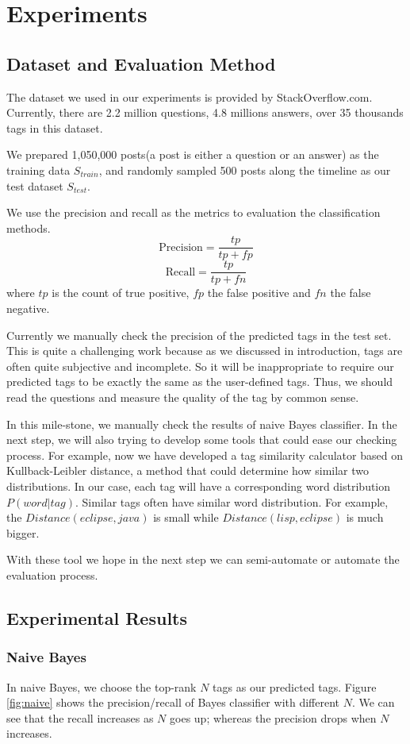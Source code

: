 \section{Experiments}

\subsection{Dataset and Evaluation Method}
The dataset we used in our experiments is provided by StackOverflow.com. Currently, there are 2.2 million questions, 4.8 millions answers, over 35 thousands tags in this dataset\cite{DataDump}.

We prepared 1,050,000 posts(a post is either a question or an answer)  as the training data $S_{train}$, and randomly sampled 500 posts along the timeline as our test dataset $S_{test}$.

We use the precision and recall as the metrics to evaluation the classification methods.
$$ \text{Precision}=\frac{tp}{tp+fp} $$
$$ \text{Recall}=\frac{tp}{tp+fn} $$
where $tp$ is the count of true positive, $fp$ the false positive and $fn$ the false negative.

Currently we manually check the precision of the predicted tags in the test set. This is quite a challenging work because as we discussed in introduction, tags are often quite subjective and incomplete. So it will be inappropriate to require our predicted tags to be exactly the same as the user-defined tags. Thus, we should read the questions and measure the quality of the tag by common sense. 

In this mile-stone, we manually check the results of naive Bayes classifier. In the next step, we will also trying to develop some tools that could ease our checking process. For example, now we have developed a tag similarity calculator based on Kullback-Leibler distance, a method that could determine how similar two 
distributions. In our case, each tag will have a corresponding word distribution $P(word|tag)$. Similar tags often have similar word distribution. For example, the $Distance(eclipse, java)$ is small while $Distance(lisp, eclipse)$ is much bigger.

With these tool we hope in the next step we can semi-automate or automate the evaluation process.

\subsection{Experimental Results}
\subsubsection{Naive Bayes}
In naive Bayes, we choose the top-rank $N$ tags as our predicted tags. Figure \ref{fig:naive} shows the precision/recall of Bayes classifier with different $N$. We can see that the recall increases as $N$ goes up; whereas the precision drops when $N$ increases.

